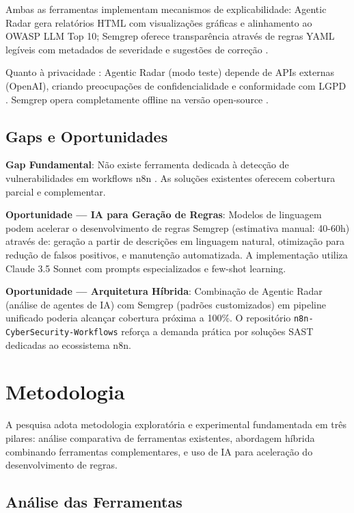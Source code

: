 \documentclass[12pt,a4paper]{article}
\begin{document}
Ambas as ferramentas implementam mecanismos de explicabilidade: Agentic Radar gera relatórios HTML com visualizações gráficas e alinhamento ao OWASP LLM Top 10; Semgrep oferece transparência através de regras YAML legíveis com metadados de severidade e sugestões de correção \cite{owasp_source_code_analysis}.

Quanto à privacidade \cite{n8n_privacy}: Agentic Radar (modo teste) depende de APIs externas (OpenAI), criando preocupações de confidencialidade e conformidade com LGPD \cite{lgpd_lei,n8n_legal}. Semgrep opera completamente offline na versão open-source \cite{gitlab_sast}.

\subsection{Gaps e Oportunidades}

\textbf{Gap Fundamental}: Não existe ferramenta dedicada à detecção de vulnerabilidades em workflows n8n \cite{owasp_lcnc_top10}. As soluções existentes oferecem cobertura parcial e complementar.

\textbf{Oportunidade — IA para Geração de Regras}: Modelos de linguagem podem acelerar o desenvolvimento de regras Semgrep (estimativa manual: 40-60h) através de: geração a partir de descrições em linguagem natural, otimização para redução de falsos positivos, e manutenção automatizada. A implementação utiliza Claude 3.5 Sonnet com prompts especializados e few-shot learning.

\textbf{Oportunidade — Arquitetura Híbrida}: Combinação de Agentic Radar (análise de agentes de IA) com Semgrep (padrões customizados) em pipeline unificado poderia alcançar cobertura próxima a 100\%. O repositório \texttt{n8n-CyberSecurity-Workflows} \cite{n8n_cybersecurity_workflows} reforça a demanda prática por soluções SAST dedicadas ao ecossistema n8n.

\section{Metodologia}
\label{sec:metodologia}

A pesquisa adota metodologia exploratória e experimental fundamentada em três pilares: análise comparativa de ferramentas existentes, abordagem híbrida combinando ferramentas complementares, e uso de IA para aceleração do desenvolvimento de regras.

\subsection{Análise das Ferramentas}
\end{document}
